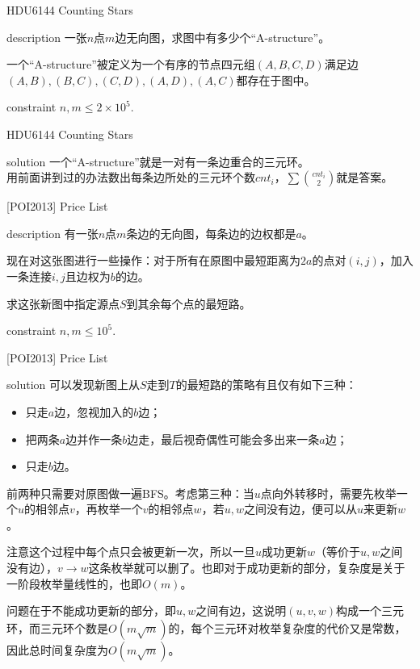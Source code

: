 \documentclass{beamer}
\def\le{\leqslant}
\begin{document}
\begin{frame}{HDU6144 Counting Stars}
	\begin{block}{description}
		一张$n$点$m$边无向图，求图中有多少个“A-structure”。
		
		一个“A-structure”被定义为一个有序的节点四元组$(A, B, C, D)$满足边$(A, B), (B, C), (C, D), (A, D), (A, C)$都存在于图中。
	\end{block}
	\begin{block}{constraint}
		$n, m \le 2 \times 10^5.$
	\end{block}
\end{frame}
\begin{frame}{HDU6144 Counting Stars}
	\begin{block}{solution}
		一个“A-structure”就是一对有一条边重合的三元环。\\
		
		用前面讲到过的办法数出每条边所处的三元环个数$cnt_i$，$\sum \binom{cnt_i}{2}$就是答案。
	\end{block}
\end{frame}
\begin{frame}{[POI2013] Price List}
	\begin{block}{description}
		有一张$n$点$m$条边的无向图，每条边的边权都是$a$。
		
		现在对这张图进行一些操作：对于所有在原图中最短距离为$2a$的点对$(i, j)$，加入一条连接$i, j$且边权为$b$的边。
		
		求这张新图中指定源点$S$到其余每个点的最短路。
	\end{block}
	\begin{block}{constraint}
		$n, m \le 10^5.$
	\end{block}
\end{frame}
\begin{frame}{[POI2013] Price List}
	\begin{block}{solution}
		可以发现新图上从$S$走到$T$的最短路的策略有且仅有如下三种：
		\begin{itemize}
			\item 只走$a$边，忽视加入的$b$边；
			\item 把两条$a$边并作一条$b$边走，最后视奇偶性可能会多出来一条$a$边；
			\item 只走$b$边。
		\end{itemize}
		
		前两种只需要对原图做一遍BFS。考虑第三种：当$u$点向外转移时，需要先枚举一个$u$的相邻点$v$，再枚举一个$v$的相邻点$w$，若$u, w$之间没有边，便可以从$u$来更新$w$。\pause
		
		注意这个过程中每个点只会被更新一次，所以一旦$u$成功更新$w$（等价于$u, w$之间没有边），$v \to w$这条枚举就可以删了。也即对于成功更新的部分，复杂度是关于一阶段枚举量线性的，也即$O(m)$。\pause
		
		问题在于不能成功更新的部分，即$u, w$之间有边，这说明$(u, v, w)$构成一个三元环，而三元环个数是$O(m\sqrt m)$的，每个三元环对枚举复杂度的代价又是常数，因此总时间复杂度为$O(m\sqrt m)$。
	\end{block}
\end{frame}
\end{document}
